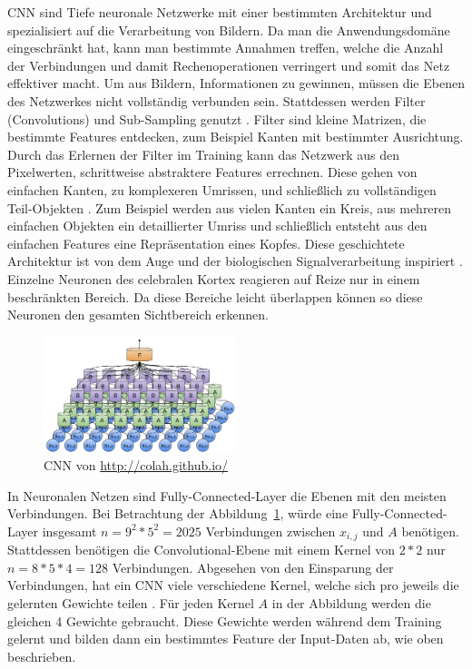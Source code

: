 \documentclass[pdftex,a4paper,halfparskip, article]{scrartcl}
\begin{document}
CNN sind Tiefe neuronale Netzwerke mit einer bestimmten Architektur und spezialisiert auf die Verarbeitung von Bildern. Da man die Anwendungsdomäne eingeschränkt hat, kann man bestimmte Annahmen treffen, welche die Anzahl der Verbindungen und damit Rechenoperationen verringert und somit das Netz effektiver macht. Um aus Bildern, Informationen zu gewinnen, müssen die Ebenen des Netzwerkes nicht vollständig verbunden sein. Stattdessen werden Filter (Convolutions) und Sub-Sampling genutzt \cite{colahsBlogCnn}. Filter sind kleine Matrizen, die bestimmte Features entdecken, zum Beispiel Kanten mit bestimmter Ausrichtung. Durch das Erlernen der Filter im Training kann das Netzwerk aus den Pixelwerten, schrittweise abstraktere Features errechnen. Diese gehen von einfachen Kanten, zu komplexeren Umrissen, und schließlich zu vollständigen Teil-Objekten . Zum Beispiel werden aus vielen Kanten ein Kreis, aus mehreren einfachen Objekten ein detaillierter Umriss und schließlich entsteht aus den einfachen Features eine Repräsentation eines Kopfes.
Diese geschichtete Architektur ist von dem Auge und der biologischen Signalverarbeitung inspiriert \cite{Hubel68}. Einzelne Neuronen des celebralen Kortex reagieren auf Reize nur in einem beschränkten Bereich. Da diese Bereiche leicht überlappen können so diese Neuronen den gesamten Sichtbereich erkennen. 

\begin{figure}[h]
\centering
\includegraphics[width=0.5\textwidth]{colah_cnn}
\caption{CNN von \url{http://colah.github.io/}}
\label{fig:colah-cnn}
\end{figure}


In Neuronalen Netzen sind Fully-Connected-Layer die Ebenen mit den meisten Verbindungen. Bei Betrachtung der Abbildung~\ref{fig:colah-cnn}, würde eine Fully-Connected-Layer insgesamt $ n = 9^2 * 5^2 = 2025$ Verbindungen zwischen $x_{i, j}$ und $A$ benötigen. Stattdessen benötigen die Convolutional-Ebene mit einem Kernel von $2*2$ nur $n = 8 * 5 *4 = 128$ Verbindungen. Abgesehen von den Einsparung der Verbindungen, hat ein CNN viele verschiedene Kernel, welche sich pro jeweils die gelernten Gewichte teilen \cite{colahsBlogCnn}. Für jeden Kernel $A$ in der Abbildung werden die gleichen 4 Gewichte gebraucht. Diese Gewichte werden während dem Training gelernt und bilden dann ein bestimmtes Feature der Input-Daten ab, wie oben beschrieben.
\end{document}
